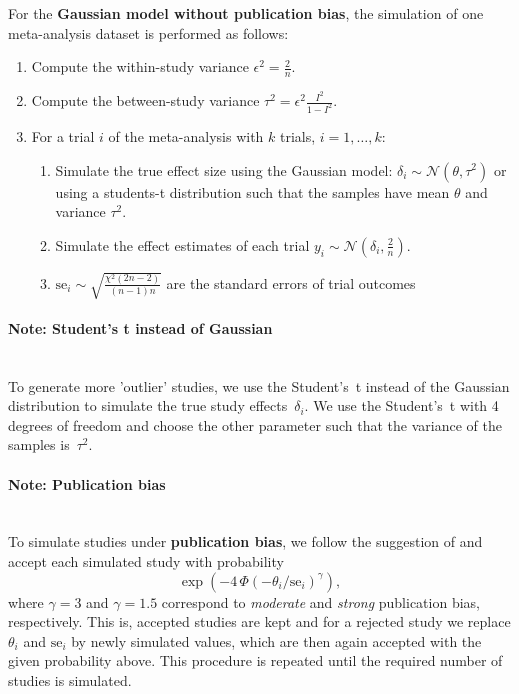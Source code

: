 \documentclass[letterpaper, 9pt]{article}
\newcommand{\N}{\mathcal{N}}
\begin{document}
For the \textbf{Gaussian model without publication bias}, the simulation of one meta-analysis dataset is performed as follows:
\begin{enumerate}
\item Compute the within-study variance $\epsilon^2 = \frac{2}{n}$.
\item Compute the between-study variance $\tau^2 = \epsilon^2 \frac{I^2}{1-I^2}$. 
\item For a trial $i$ of the meta-analysis with $k$ trials, $i = 1, \dots, k$:
  \begin{enumerate}
  \item Simulate the true effect size using the Gaussian model: $\delta_i \sim \N(\theta, \tau^2)$ or using a students-t distribution such that the samples have mean $\theta$ and variance $\tau^2$.
  \item Simulate the effect estimates of each trial $y_i \sim \N(\delta_i, \frac{2}{n})$.
  \item $\text{se}_i \sim \sqrt{\frac{\chi^2(2n-2)}{(n-1)n}}$ are the standard errors of trial outcomes
  \end{enumerate}
\end{enumerate}

\paragraph{Note: Student's t instead of Gaussian}\mbox{}\\
To generate more 'outlier' studies, we use the Student's~t instead of the Gaussian distribution to simulate the true study effects~$\delta_i$. 
We use the Student's~t with 4 degrees of freedom and choose the other parameter such that the variance of the samples is~$\tau^2$. 


\paragraph{Note: Publication bias}\mbox{}\\
To simulate studies under \textbf{publication bias}, we follow the suggestion of \cite{henm:copa:10} and accept each simulated study with probability
$$\exp(-4\, \Phi(-\theta_i / \text{se}_i)^\gamma ),$$
where $\gamma = 3$ and $\gamma = 1.5$ correspond to \emph{moderate} and \emph{strong} publication bias, respectively.
This is, accepted studies are kept and for a rejected study we replace $\theta_i$ and $\text{se}_i$ by newly simulated values, which are then again accepted with the given probability above.
This procedure is repeated until the required number of studies is simulated. 
\end{document}
